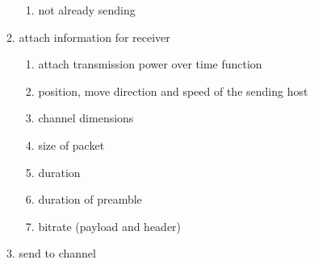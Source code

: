 \begin{enumerate}
\begin{enumerate}
\begin{enumerate}
		\item not already sending \label{sendPreqSending}
		\end{enumerate}
	\item attach information for receiver
		\begin{enumerate}
		\item attach transmission power over time function \label{sendInfoTXPower}
		\item position, move direction and speed of the sending host \label{sendInfoMove}
		\item channel dimensions\label{sendInfoChannel}
		\item size of packet \label{sendInfoSize}
		\item duration \label{sendInfoDuration}
		\item duration of preamble \label{sendInfoPreambleDuration}
		\item bitrate (payload and header) \label{sendInfoBitrate}
		\end{enumerate}	
	\item send to channel \label{sendToChannel}
	

\end{enumerate}
\end{enumerate}
